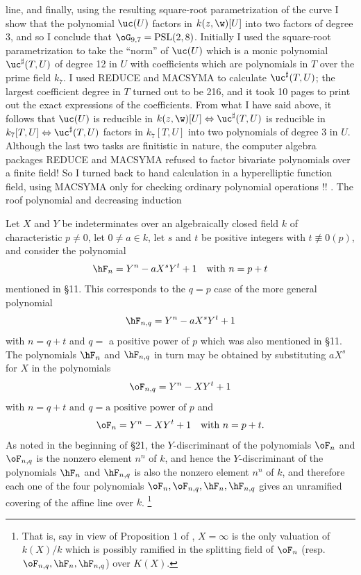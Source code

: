 line, and
finally, using the resulting square-root parametrization 
of the curve I 
show that the polynomial $\uc(U)$ factors in $k(z,\w)[U]$ 
into
two factors of degree 3, and so I conclude that 
$\oG_{9,7}=\operatorname{PSL}(2,8)$.
Initially I used the square-root parametrization to take 
the ``norm''
of $\uc(U)$ which is a monic polynomial 
$\uc^{\sharp}(T,U)$ of degree 12 in $U$ 
with coefficients which are polynomials in $T$ over the 
prime field 
$k_7$. I used REDUCE and MACSYMA to calculate 
$\uc^{\sharp}(T,U)$; the
largest coefficient degree in $T$ turned out to be 216, 
and it took 10 
pages to print out the exact expressions of the 
coefficients. From what I 
have said above, it follows that 
$\uc(U)$ is reducible in 
$k(z,\w)[U]\Leftrightarrow\uc^{\sharp}(T,U)$ is 
reducible in $k_7[T,U]\Leftrightarrow\uc^{\sharp}(T,U)$ 
factors 
in $k_7[T,U]$ into two polynomials of degree 3 in $U$. 
Although the last two 
tasks are finitistic in nature, the computer algebra 
packages REDUCE
and MACSYMA refused to factor bivariate polynomials over a 
finite field!
So I turned back to hand calculation in a hyperelliptic 
function field, using
MACSYMA only for checking ordinary polynomial operations !!
\endrem
. The roof polynomial and decreasing 
induction\endheading

Let $X$ and $Y$ be indeterminates over an algebraically  
closed field $k$
of characteristic $p\ne 0$, let $0\ne a\in k$, let $s$ and 
$t$ be positive
integers with $t\not\equiv 0(p)$, and consider the 
polynomial
$$
\hF_n=Y^n-aX^sY^t+1\quad \text{with }n=p+t
$$
mentioned in \S11. This  corresponds to the $q=p$ case of 
the more
general polynomial
$$
\hF_{n,q}=Y^n-aX^sY^t+1
$$ 
with $n=q+t$ and $q=$ a positive
power of $p$
which was also mentioned in \S11. The polynomials $\hF_n$ 
and $\hF_{n,q}$
in turn may be obtained by substituting $aX^s$ for $X$ in 
the polynomials
$$
\oF_{n,q}=Y^n-XY^t+1
$$
with $n=q+t\text{ and }q=\text{a positive
power of }p$
and
$$
\oF_{n}=Y^n-XY^t+1\quad \text{with }n=p+t.
$$
As noted in the beginning of \S21, 
the $Y$-discriminant of the polynomials $\oF_n$ and 
$\oF_{n,q}$ is the
nonzero element $n^n$ of $k$, and hence 
the $Y$-discriminant of the polynomials $\hF_n$ and 
$\hF_{n,q}$ is also the
nonzero element $n^n$ of $k$, and therefore each one of 
the four polynomials 
$\oF_{n},\oF_{n,q},\hF_{n},\hF_{n,q}$ gives an unramified 
covering of the 
affine line over $k$.
\footnote{That is, say in view of Proposition 1 of 
\cite{A1}, $X=\infty$ is
the only valuation of $k(X)/k$ which is possibly ramified 
in the splitting
field of $\oF_{n}$ (resp.\ $\oF_{n,q},\hF_{n},\hF_{n,q}$) 
over $K(X)$.}

